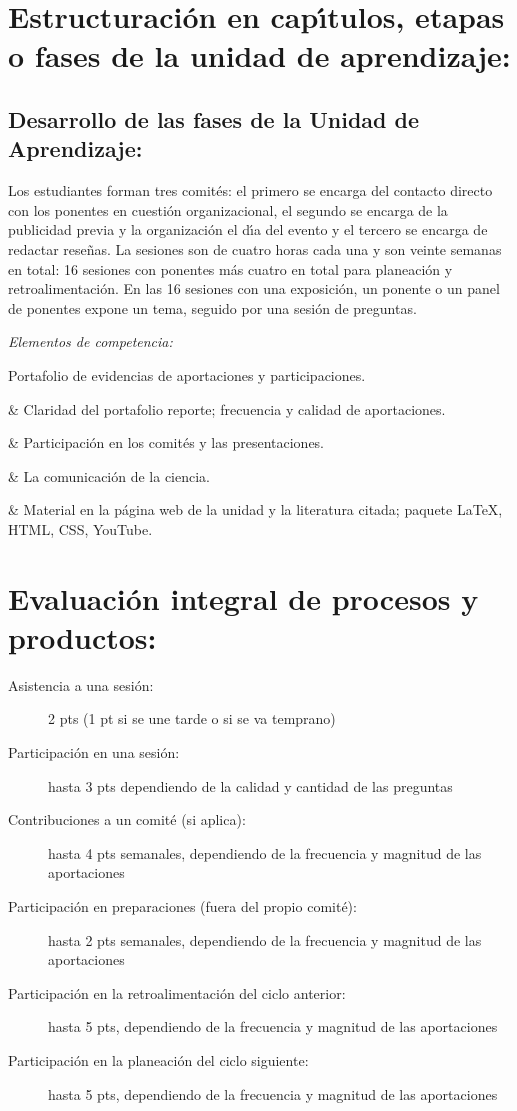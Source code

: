 \documentclass[10 pt]{article}
\begin{document}
\newpage
\section{Estructuraci\'{o}n en cap\'{\i}tulos, etapas o fases de la unidad de
  aprendizaje:}
\subsection{Desarrollo de las fases de la Unidad de Aprendizaje:}

Los estudiantes forman tres comit\'{e}s: el primero se encarga del
contacto directo con los ponentes en cuesti\'{o}n organizacional, el
segundo se encarga de la publicidad previa y la organizaci\'{o}n el d\'{\i}a
del evento y el tercero se encarga de redactar rese\~{n}as.  La sesiones
son de cuatro horas cada una y son veinte semanas en total: 16
sesiones con ponentes m\'{a}s cuatro en total para planeaci\'{o}n y
retroalimentaci\'{o}n. En las 16 sesiones con una exposici\'{o}n, un ponente o
un panel de ponentes expone un tema, seguido por una sesi\'{o}n de
preguntas.

{\em Elementos de competencia:}


Portafolio de evidencias de aportaciones y participaciones.

& Claridad del portafolio reporte; frecuencia y calidad de aportaciones.

& Participaci\'{o}n en los comit\'{e}s y las presentaciones.

& La comunicaci\'{o}n de la ciencia.

& Material en la p\'{a}gina web de la unidad y la
literatura citada; paquete {\LaTeX}, HTML, CSS, YouTube.


  \section{Evaluaci\'{o}n integral de procesos y productos:}
  

  \begin{description}
  \item[Asistencia a una sesi\'{o}n:]{2 pts (1 pt si se une tarde o si se
      va temprano)}
  \item[Participaci\'{o}n en una sesi\'{o}n:]{hasta 3 pts dependiendo de la
      calidad y cantidad de las preguntas}
  \item[Contribuciones a un comit\'{e} (si aplica):]{hasta 4 pts
      semanales, dependiendo de la frecuencia y magnitud de las
      aportaciones}
  \item[Participaci\'{o}n en preparaciones (fuera del propio
    comit\'{e}):]{hasta 2 pts semanales, dependiendo de la frecuencia y
      magnitud de las aportaciones}
  \item[Participaci\'{o}n en la retroalimentaci\'{o}n del ciclo
    anterior:]{hasta 5 pts, dependiendo de la frecuencia y magnitud de
      las aportaciones}
  \item[Participaci\'{o}n en la planeaci\'{o}n del ciclo siguiente:]{hasta 5
      pts, dependiendo de la frecuencia y magnitud de las
      aportaciones}
  \end{description}
\end{document}

